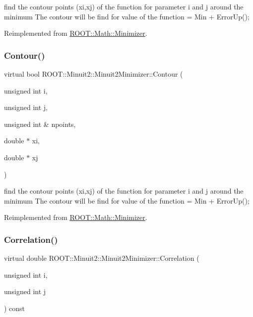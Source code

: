 find the contour points (xi,xj) of the function for parameter i and j around the minimum The contour will be find for value of the function = Min + Error\+Up(); 

Reimplemented from \mbox{\hyperlink{classROOT_1_1Math_1_1Minimizer_aeb8855190ff2e37911c38ed839f2043c}{R\+O\+O\+T\+::\+Math\+::\+Minimizer}}.

\mbox{\label{classROOT_1_1Minuit2_1_1Minuit2Minimizer_a026780c27dd4b179817f826f49e36c8e}} 
\subsubsection{\texorpdfstring{Contour()}{Contour()}\hspace{0.1cm}{\footnotesize\ttfamily [3/3]}}
{\footnotesize\ttfamily virtual bool R\+O\+O\+T\+::\+Minuit2\+::\+Minuit2\+Minimizer\+::\+Contour (\begin{DoxyParamCaption}\item[{unsigned int}]{i,  }\item[{unsigned int}]{j,  }\item[{unsigned int \&}]{npoints,  }\item[{double $\ast$}]{xi,  }\item[{double $\ast$}]{xj }\end{DoxyParamCaption})\hspace{0.3cm}{\ttfamily [virtual]}}

find the contour points (xi,xj) of the function for parameter i and j around the minimum The contour will be find for value of the function = Min + Error\+Up(); 

Reimplemented from \mbox{\hyperlink{classROOT_1_1Math_1_1Minimizer_aeb8855190ff2e37911c38ed839f2043c}{R\+O\+O\+T\+::\+Math\+::\+Minimizer}}.

\mbox{\label{classROOT_1_1Minuit2_1_1Minuit2Minimizer_a229e82025189e72b5a03cb4e3be19f4a}} 
\subsubsection{\texorpdfstring{Correlation()}{Correlation()}\hspace{0.1cm}{\footnotesize\ttfamily [1/3]}}
{\footnotesize\ttfamily virtual double R\+O\+O\+T\+::\+Minuit2\+::\+Minuit2\+Minimizer\+::\+Correlation (\begin{DoxyParamCaption}\item[{unsigned int}]{i,  }\item[{unsigned int}]{j }\end{DoxyParamCaption}) const\hspace{0.3cm}{\ttfamily [virtual]}}

